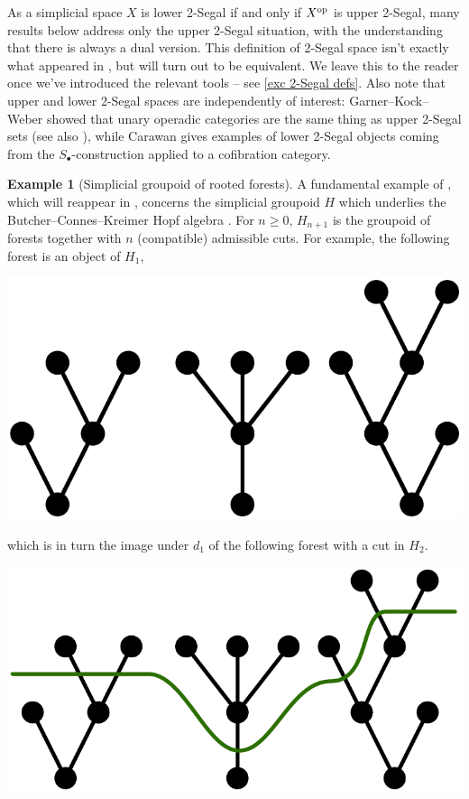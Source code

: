\documentclass{amsart}
\theoremstyle{definition}
\newtheorem{example}[theorem]{Example}
\theoremstyle{remark}
\newcommand{\op}{\textup{op}}
\begin{document}
As a simplicial space $X$ is lower 2-Segal if and only if $X^\op$ is upper 2-Segal, many results below address only the upper 2-Segal situation, with the understanding that there is always a dual version.
This definition of 2-Segal space isn't exactly what appeared in \cite{Stern:BIRS}, but will turn out to be equivalent.
We leave this to the reader once we've introduced the relevant tools --
see \cref{exc 2-Segal defs}.
Also note that upper and lower 2-Segal spaces are independently of interest: Garner--Kock--Weber \cite{GarnerKockWeber:OCD} showed that unary operadic categories are the same thing as upper 2-Segal sets (see also \cite{Hackney:OC2SS}), while Carawan \cite{Carawan:2SMACWC} gives examples of lower 2-Segal objects coming from the $S_\bullet$-construction applied to a cofibration category.

\begin{example}[Simplicial groupoid of rooted forests]\label{ex graphs}
A fundamental example of \cite{GKT1}, which will reappear in \cite{Tonks:BIRS}, concerns the simplicial groupoid $H$ which underlies the Butcher--Connes--Kreimer Hopf algebra \cite{ConnesKreimer:HARNG}.
For $n \geq 0$, $H_{n+1}$ is the groupoid of forests together with $n$ (compatible) admissible cuts.
For example, the following forest is an object of $H_1$,
\begin{center}
\includegraphics[scale=0.2]{forest_no_cut.pdf}
\end{center}
which is in turn the image under $d_1$ of the following forest with a cut in $H_2$.
\begin{center}
\includegraphics[scale=0.2]{forest_with_cut.pdf}

\end{center}
\end{example}
\end{document}

